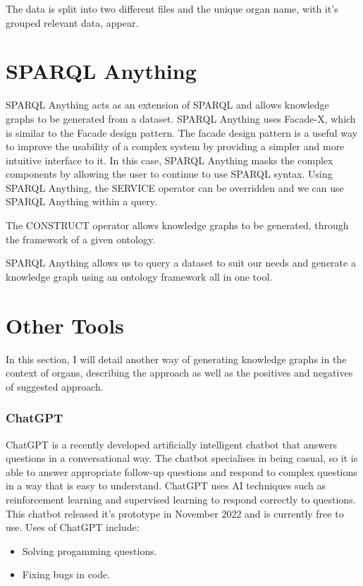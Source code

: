 The data is split into two different files and the unique organ name, with it's grouped relevant data, appear.  

\section{SPARQL Anything}
\hspace{0.5cm} SPARQL Anything acts as an extension of SPARQL and allows knowledge graphs to be generated from a dataset. SPARQL Anything uses Facade-X, which is similar to the Facade design pattern. The facade design pattern is a useful way to improve the usability of a complex system by providing a simpler and more intuitive interface to it. In this case, SPARQL Anything masks the complex components by allowing the user to continue to use SPARQL syntax. Using SPARQL Anything, the SERVICE operator can  be overridden and we can use SPARQL Anything within a query. \cite{sparqlanything}

The CONSTRUCT operator allows knowledge graphs to be generated, through the framework of a given ontology. \cite{sparqlanythinggithub}

SPARQL Anything allows us to query a dataset to suit our needs and generate a knowledge graph using an ontology framework all in one tool. \cite{sparqlanythinggithub}

\section{Other Tools}

\hspace{0.5cm} In this section, I will detail another way of generating knowledge graphs in the context of organs, describing  the approach as well as the positives and negatives of suggested approach.

\subsubsection{ChatGPT}
\hspace{0.5cm} ChatGPT is a recently developed artificially intelligent chatbot that answers questions in a conversational way. The chatbot specialises in being casual, so it is able to answer appropriate follow-up questions and respond to complex questions in a way that is easy to understand. ChatGPT uses AI techniques such as reinforcement learning and supervised learning to respond correctly to questions. \cite{chatgptwiki} This chatbot released it's prototype in November 2022 and is currently free to use. Uses of ChatGPT include:
\begin{itemize}
\item Solving progamming questions.
\item Fixing bugs in code.
\end{itemize}

